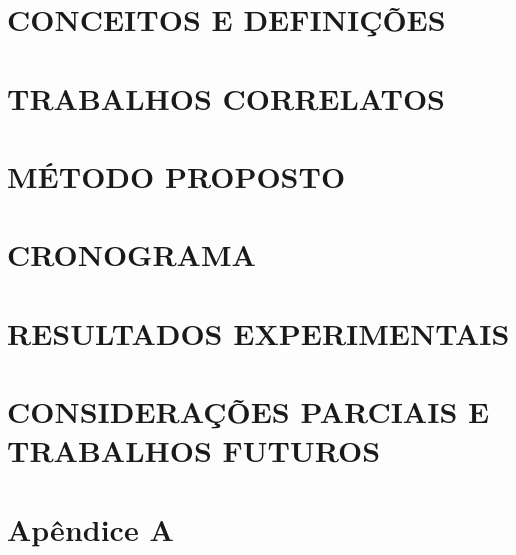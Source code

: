 \documentclass[
	12pt, %
    oneside, %
	a4paper, %
	chapter=TITLE, %
	english, %
	brazil %
	]{abntex2}
\begin{document}
\chapter{CONCEITOS E DEFINIÇÕES}

\chapter{TRABALHOS CORRELATOS}

\chapter{MÉTODO PROPOSTO}

\chapter{CRONOGRAMA}

\chapter{RESULTADOS EXPERIMENTAIS}

\chapter{CONSIDERAÇÕES PARCIAIS E TRABALHOS FUTUROS}

\chapter{Apêndice A}

\addto\captionsportuguese{\renewcommand{\bibname}{Reference}}
\renewcommand{\bibname}{Referências}

%
\end{document}
